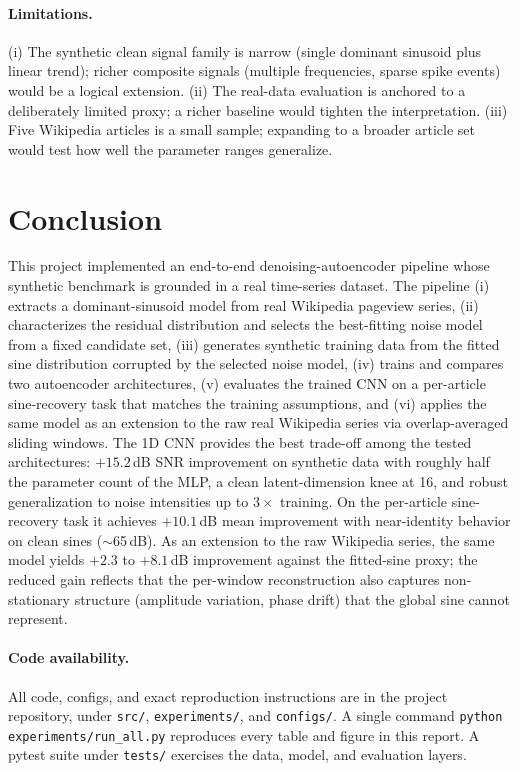\documentclass[11pt]{article}
\begin{document}
\paragraph{Limitations.}
(i) The synthetic clean signal family is narrow (single dominant sinusoid plus linear trend); richer composite signals (multiple frequencies, sparse spike events) would be a logical extension. (ii) The real-data evaluation is anchored to a deliberately limited proxy; a richer baseline would tighten the interpretation. (iii) Five Wikipedia articles is a small sample; expanding to a broader article set would test how well the parameter ranges generalize.

\section{Conclusion}

This project implemented an end-to-end denoising-autoencoder pipeline whose synthetic benchmark is grounded in a real time-series dataset. The pipeline (i) extracts a dominant-sinusoid model from real Wikipedia pageview series, (ii) characterizes the residual distribution and selects the best-fitting noise model from a fixed candidate set, (iii) generates synthetic training data from the fitted sine distribution corrupted by the selected noise model, (iv) trains and compares two autoencoder architectures, (v) evaluates the trained CNN on a per-article sine-recovery task that matches the training assumptions, and (vi) applies the same model as an extension to the raw real Wikipedia series via overlap-averaged sliding windows. The 1D CNN provides the best trade-off among the tested architectures: $+15.2$\,dB SNR improvement on synthetic data with roughly half the parameter count of the MLP, a clean latent-dimension knee at 16, and robust generalization to noise intensities up to $3\times$ training. On the per-article sine-recovery task it achieves $+10.1$\,dB mean improvement with near-identity behavior on clean sines ($\sim$65\,dB). As an extension to the raw Wikipedia series, the same model yields $+2.3$ to $+8.1$\,dB improvement against the fitted-sine proxy; the reduced gain reflects that the per-window reconstruction also captures non-stationary structure (amplitude variation, phase drift) that the global sine cannot represent.

\paragraph{Code availability.}
All code, configs, and exact reproduction instructions are in the project repository, under \texttt{src/}, \texttt{experiments/}, and \texttt{configs/}. A single command \texttt{python experiments/run\_all.py} reproduces every table and figure in this report. A pytest suite under \texttt{tests/} exercises the data, model, and evaluation layers.
\end{document}

